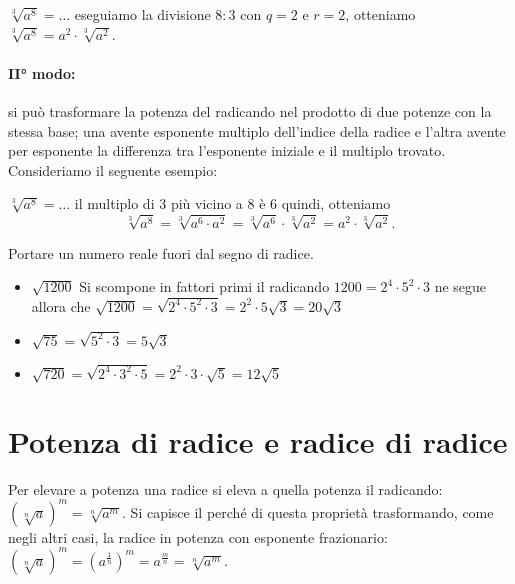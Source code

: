  $\sqrt[3]{a^8}=\ldots $ eseguiamo la divisione $8:3$ con $q=2$ e $r=2$,
 otteniamo $\sqrt[3]{a^8}=a^2\cdot \sqrt[3]{a^2}$.

\paragraph{II° modo:} si può trasformare la potenza del radicando nel
prodotto di due potenze con la stessa base; una avente esponente multiplo
dell'indice della radice e l'altra avente per esponente la differenza tra
l'esponente iniziale e il multiplo trovato. Consideriamo il seguente
esempio:

 $\sqrt[3]{a^8}=\ldots $ il multiplo di $3$ più vicino a $8$ è $6$ quindi,
 otteniamo
\[\sqrt[3]{a^8}=\sqrt[3]{a^6\cdot a^2}=\sqrt[3]{a^6}\cdot \sqrt[3]{a^2}=
  a^2\cdot \sqrt[3]{a^2}.\]

 \begin{esempio}
 Portare un numero reale fuori dal segno di radice.
\begin{itemize}
 \item $\sqrt{1200}$ Si scompone in fattori primi il radicando
       $1200=2^4\cdot 5^2\cdot 3$ ne segue allora che
       $\sqrt{1200}=\sqrt{2^4\cdot 5^2\cdot 3}=2^2\cdot
5\sqrt{3}=20\sqrt{3}$
 \item $\sqrt{75}=\sqrt{5^2\cdot 3}=5\sqrt{3}$
 \item $\sqrt{720}=\sqrt{2^4\cdot 3^2\cdot 5}=
        2^2\cdot 3\cdot \sqrt 5=12\sqrt 5$
\end{itemize}
 \end{esempio}

\section{Potenza di radice e radice di radice}
\label{sec:radicali_potenza}

Per elevare a potenza una radice si eleva a quella potenza il radicando:
$\left(\sqrt[n]a\right)^m=\sqrt[n]{a^m}$.
Si capisce il perché di questa proprietà trasformando, come negli altri
casi, la radice in potenza con esponente frazionario:
$\left(\sqrt[n]a\right)^m=\left(a^{\frac 1 n}\right)^m=a^{\frac m n}=
 \sqrt[n]{a^m}$.

